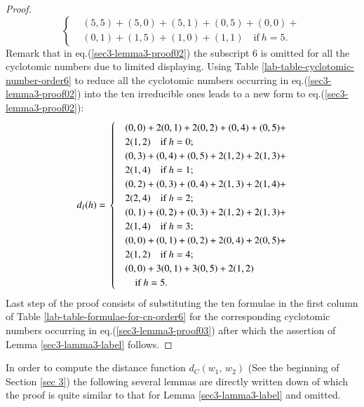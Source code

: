 \documentclass[letter]{ieice}
\begin{document}
\begin{proof}
\begin{equation}
\begin{cases}
&(5,5)+(5,0)+(5,1)+(0,5)+(0,0)+\\
&(0,1)+(1,5)+(1,0)+(1,1)\quad \mbox{if}\ h=5.
 \end{cases}
\end{equation}
Remark that in eq.(\ref{sec3-lemma3-proof02}) the subscript 6 is omitted for all the cyclotomic numbers due to limited displaying. Using Table \ref{lab-table-cyclotomic-number-order6} to reduce all the cyclotomic numbers occurring in eq.(\ref{sec3-lemma3-proof02}) into the ten irreducible ones leads to a new form to eq.(\ref{sec3-lemma3-proof02}):
\begin{equation}\label{sec3-lemma3-proof03}
 d_{I}(h)=\\
 \begin{cases}
 &(0,0)+2(0,1)+2(0,2)+(0,4)+(0,5)+\\
 & 2(1,2) \quad \mbox{if}\ h=0;\\
 &(0,3)+(0,4)+(0,5)+2(1,2)+2(1,3)+\\
 & 2(1,4) \quad \mbox{if}\ h=1;\\
 &(0,2)+(0,3)+(0,4)+2(1,3)+2(1,4)+\\
 & 2(2,4) \quad \mbox{if}\ h=2;\\
 &(0,1)+(0,2)+(0,3)+2(1,2)+2(1,3)+\\
 & 2(1,4) \quad \mbox{if}\ h=3;\\
 &(0,0)+(0,1)+(0,2)+2(0,4)+2(0,5)+\\
 & 2(1,2) \quad \mbox{if}\ h=4;\\
 &(0,0)+3(0,1)+3(0,5)+2(1,2)\\ 
 &\quad \mbox{if}\ h=5.
 \end{cases}
\end{equation}
Last step of the proof consists of substituting the ten formulae in the first column of Table \ref{lab-table-formulae-for-cn-order6} for the corresponding cyclotomic numbers occurring in eq.(\ref{sec3-lemma3-proof03}) after which the assertion of Lemma \ref{sec3-lamma3-label} follows.
 \end{proof} 
 
 In order to compute the distance function $  d_{\mathit{C}}(w_{1},\,w_{2}) $ (See the beginning of Section \ref{sec 3}) the following several lemmas are directly written down of which the proof is quite similar to that for Lemma \ref{sec3-lamma3-label} and omitted.
 
\end{document}
